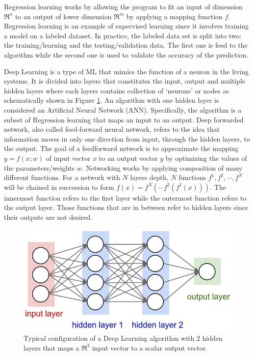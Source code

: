 Regression learning works by allowing the program to fit an input of dimension
$\mathfrak{R}^n$ to an output of lower dimension $\mathfrak{R}^m$ by applying a
mapping function $f$.
Regression learning is an example of supervised learning since it
involves training a model on a labeled dataset. In practice, the labeled data
set is split into two: the training/learning and the testing/validation
data. The first one is feed to the algorithm while the second one is used to
validate the accuracy of the prediction.

Deep Learning is a type of ML that mimics the function of a
neuron in the living systems. It is divided into layers that constitutes the
input, output and multiple hidden layers where each layers contains collection
of
`neurons' or nodes as schematically shown in Figure \ref{fig:DL}. An algorithm
with one
hidden layer is
considered an Artificial Neural Network (ANN). Specifically, the algorithm is a
subset of Regression learning that maps an input to an output. Deep forwarded
network, also called
feed-forward neural network, refers to the idea that information moves in only
one direction from input, through the hidden layers,  to the output.  The goal
of a feedforward network is to approximate the mapping $y = f(x; w)$ of input
vector $x$ to an output vector $y$ by optimizing the values of the
parameters/weights $w$. Networking works by applying composition of many
different
functions. For a network with  $N$ layers depth, $N$ functions $f^1, f^2,
    \cdots, f^N$ will be
chained in succession to form $f(x) = f^N(\cdots f^2(f^1(x)))$. The innermost
function
refers to the first layer while the outermost function refers to the output
layer. Those functions that are in between refer to hidden layers since their
outputs are not desired.

\begin{figure}[h!]
    \centering
    \includegraphics[width=0.5\linewidth]{images/DL.png}
    \caption{Typical configuration of a Deep Learning algorithm with 2 hidden
        layers that maps a $\mathfrak{R}^3$ input vector to a scalar output
        vector.}
    \label{fig:DL}
\end{figure}

